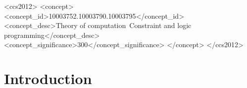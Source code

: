 \documentclass[acmsmall]{acmart}
\theoremstyle{definition}
\begin{document}
\begin{CCSXML}
  <ccs2012>
     <concept>
         <concept_id>10003752.10003790.10003795</concept_id>
         <concept_desc>Theory of computation~Constraint and logic programming</concept_desc>
         <concept_significance>300</concept_significance>
         </concept>
   </ccs2012>
\end{CCSXML}
  



\maketitle

\section{Introduction}
\end{document}
